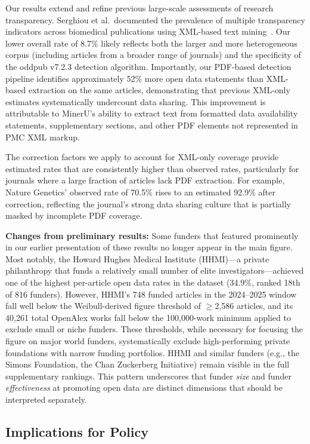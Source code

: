 Our results extend and refine previous large-scale assessments of research transparency. Serghiou et al.\ documented the prevalence of multiple transparency indicators across biomedical publications using XML-based text mining~\cite{Serghiou2021-pl}. Our lower overall rate of 8.7\% likely reflects both the larger and more heterogeneous corpus (including articles from a broader range of journals) and the specificity of the oddpub v7.2.3 detection algorithm. Importantly, our PDF-based detection pipeline identifies approximately 52\% more open data statements than XML-based extraction on the same articles, demonstrating that previous XML-only estimates systematically undercount data sharing. This improvement is attributable to MinerU's ability to extract text from formatted data availability statements, supplementary sections, and other PDF elements not represented in PMC XML markup.

The correction factors we apply to account for XML-only coverage provide estimated rates that are consistently higher than observed rates, particularly for journals where a large fraction of articles lack PDF extraction. For example, Nature Genetics' observed rate of 70.5\% rises to an estimated 92.9\% after correction, reflecting the journal's strong data sharing culture that is partially masked by incomplete PDF coverage.

\textbf{Changes from preliminary results:} Some funders that featured prominently in our earlier presentation of these results no longer appear in the main figure. Most notably, the Howard Hughes Medical Institute (HHMI)---a private philanthropy that funds a relatively small number of elite investigators---achieved one of the highest per-article open data rates in the dataset (34.9\%, ranked 18th of 816 funders). However, HHMI's 748 funded articles in the 2024--2025 window fall well below the Weibull-derived figure threshold of $\geq$2,586 articles, and its 40,261 total OpenAlex works fall below the 100,000-work minimum applied to exclude small or niche funders. These thresholds, while necessary for focusing the figure on major world funders, systematically exclude high-performing private foundations with narrow funding portfolios. HHMI and similar funders (e.g., the Simons Foundation, the Chan Zuckerberg Initiative) remain visible in the full supplementary rankings. This pattern underscores that funder \emph{size} and funder \emph{effectiveness} at promoting open data are distinct dimensions that should be interpreted separately.

\subsection{Implications for Policy}

